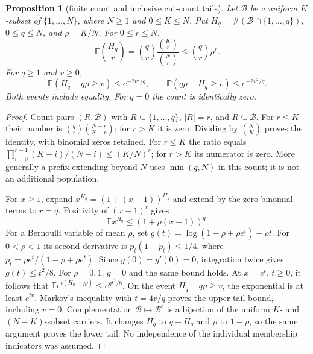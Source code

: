 \documentclass[11pt]{article}
\newtheorem{proposition}{Proposition}
\theoremstyle{remark}\newtheorem{remark}[proposition]{Remark}
\begin{document}
\begin{proposition}[finite count and inclusive cut-count tails]
\label{prop:mazur-cut-count}
Let $\mathcal B$ be a uniform $K$-subset of $\{1,\ldots,N\}$,
where $N\ge1$ and $0\le K\le N$. Put
$H_q=\#(\mathcal B\cap\{1,\ldots,q\})$, $0\le q\le N$,
and $\rho=K/N$. For $0\le r\le N$,
\begin{equation}
 \mathbb E\binom{H_q}{r}
   =\binom qr\frac{\binom Kr}{\binom Nr}
   \le\binom qr\rho^r.
 \label{eq:mazur-cut-moments}
\end{equation}
For $q\ge1$ and $v\ge0$,
\begin{equation}
 \mathbb P(H_q-q\rho\ge v)\le e^{-2v^2/q},\qquad
 \mathbb P(q\rho-H_q\ge v)\le e^{-2v^2/q}.
 \label{eq:mazur-cut-tails}
\end{equation}
Both events include equality. For $q=0$ the count is identically zero.
\end{proposition}
\begin{proof}
Count pairs $(R,\mathcal B)$ with $R\subseteq\{1,\ldots,q\}$,
$|R|=r$, and $R\subseteq\mathcal B$. For $r\le K$ their number is
$\binom qr\binom{N-r}{K-r}$; for $r>K$ it is zero.
Dividing by $\binom NK$ proves the identity, with binomial zeros retained.
For $r\le K$ the ratio equals
$\prod_{i=0}^{r-1}(K-i)/(N-i)\le(K/N)^r$;
for $r>K$ its numerator is zero.
More generally a prefix extending beyond $N$ uses $\min(q,N)$
in this count; it is not an additional population.

For $x\ge1$, expand $x^{H_q}=(1+(x-1))^{H_q}$ and extend by
the zero binomial terms to $r=q$. Positivity of $(x-1)^r$ gives
\[
 \mathbb E x^{H_q}\le(1+\rho(x-1))^q.
\]
For a Bernoulli variable of mean $\rho$, set
$g(t)=\log(1-\rho+\rho e^t)-\rho t$.
For $0<\rho<1$ its second derivative is $p_t(1-p_t)\le1/4$,
where $p_t=\rho e^t/(1-\rho+\rho e^t)$.
Since $g(0)=g'(0)=0$, integration twice gives $g(t)\le t^2/8$.
For $\rho=0,1$, $g=0$ and the same bound holds.
At $x=e^t$, $t\ge0$, it follows that
$\mathbb E e^{t(H_q-q\rho)}\le e^{qt^2/8}$.
On the event $H_q-q\rho\ge v$, the exponential is at least $e^{tv}$.
Markov's inequality with $t=4v/q$ proves the upper-tail bound,
including $v=0$. Complementation $\mathcal B\mapsto\mathcal B^c$
is a bijection of the uniform $K$- and $(N-K)$-subset carriers.
It changes $H_q$ to $q-H_q$ and $\rho$ to $1-\rho$,
so the same argument proves the lower tail. No independence of
the individual membership indicators was assumed.
\end{proof}
\end{document}
